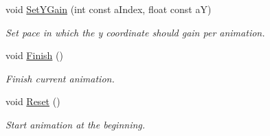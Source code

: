 \begin{DoxyCompactItemize}
$$void \hyperlink{classTextureCoordinates_a0f79f51498c73ba057f4e32083cd2ca5}{Set\+Y\+Gain} (int const a\+Index, float const aY)
\begin{DoxyCompactList}\small\item\em Set pace in which the y coordinate should gain per animation. \end{DoxyCompactList}\item 
void \hyperlink{classTextureCoordinates_ab66f14d98de0b266304c87038ec9c069}{Finish} ()
\begin{DoxyCompactList}\small\item\em Finish current animation. \end{DoxyCompactList}\item 
void \hyperlink{classTextureCoordinates_a1a2dcade83324600fb7838587743aa69}{Reset} ()
\begin{DoxyCompactList}\small\item\em Start animation at the beginning. \end{DoxyCompactList}\end{DoxyCompactItemize}
